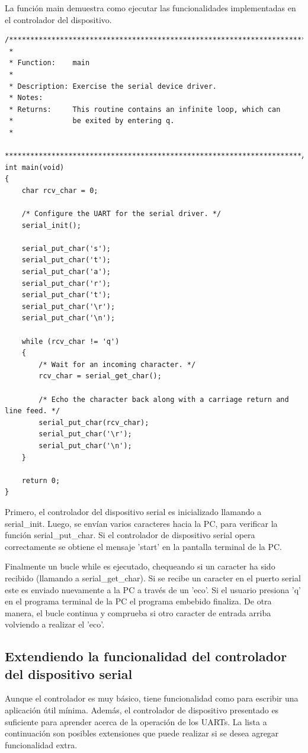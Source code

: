 \documentclass[output=paper, 
colorlinks,
citecolor=brown,
newtxmath
]{langscibook}
\begin{document}
La función main demuestra como ejecutar las funcionalidades implementadas
en el controlador del dispositivo.

\begin{verbatim}
/**********************************************************************
 *
 * Function:    main
 *
 * Description: Exercise the serial device driver.
 * Notes:       
 * Returns:     This routine contains an infinite loop, which can
 *              be exited by entering q.
 *
 **********************************************************************/
int main(void)
{
    char rcv_char = 0;

    /* Configure the UART for the serial driver. */
    serial_init();

    serial_put_char('s');
    serial_put_char('t');
    serial_put_char('a');
    serial_put_char('r');
    serial_put_char('t');
    serial_put_char('\r');
    serial_put_char('\n');

    while (rcv_char != 'q')
    {
        /* Wait for an incoming character. */
        rcv_char = serial_get_char();

        /* Echo the character back along with a carriage return and line feed. */
        serial_put_char(rcv_char);
        serial_put_char('\r');
        serial_put_char('\n');
    }

    return 0;
}
\end{verbatim}

Primero, el controlador del dispositivo serial es inicializado llamando 
a serial\_init. Luego, se envían varios caracteres hacia la PC, para 
verificar la función serial\_put\_char. Si el controlador de dispositivo serial
opera correctamente se obtiene el mensaje 'start' en la pantalla terminal
de la PC.

Finalmente un bucle while es ejecutado, chequeando si un caracter
ha sido recibido (llamando a serial\_get\_char). Si se recibe un caracter
en el puerto serial este es enviado nuevamente a la PC a través de un 'eco'.
Si el usuario presiona 'q' en el programa terminal de la PC el programa
embebido finaliza. De otra manera, el bucle continua y comprueba si otro
caracter de entrada arriba volviendo a realizar el 'eco'.


\subsection {Extendiendo la funcionalidad del controlador del dispositivo serial}


Aunque el controlador es muy básico, tiene funcionalidad como para
escribir una aplicación útil mínima.
Además, el controlador de dispositivo 
presentado es suficiente para aprender acerca de la operación de los UARTs.
La lista a continuación son posibles extensiones que puede realizar
si se desea agregar funcionalidad extra.
\end{document}
